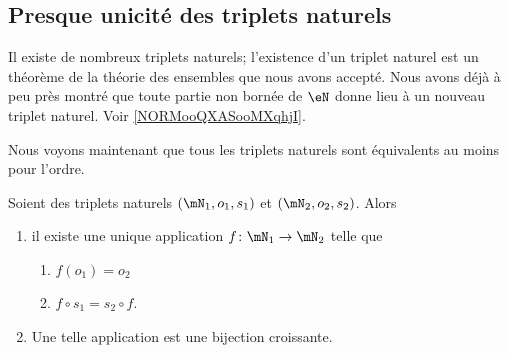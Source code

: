 \subsection{Presque unicité des triplets naturels}
\label{SUBooUniciteTripletsNaturels}

\begin{normaltext}	\label{NORooIntroUniciteTripletsNaturels}
	Il existe de nombreux triplets naturels; l'existence d'un triplet naturel est un théorème de la théorie des ensembles que nous avons accepté. Nous avons déjà à peu près montré que toute partie non bornée de \( \eN\) donne lieu à un nouveau triplet naturel. Voir \ref{NORMooQXASooMXqhjI}.

	Nous voyons maintenant que tous les triplets naturels sont équivalents au moins pour l'ordre.
\end{normaltext}

\begin{theorem}     \label{THOooFUXMooJuigHK}
	Soient des triplets naturels \( (\mN_1,o_1,s_1)\) et \( (\mN_2,o_2,s_2)\). Alors
	\begin{enumerate}
		\item
		      il existe une unique application \( f\colon \mN_1\to \mN_2\) telle que
		      \begin{enumerate}
			      \item
			            \( f(o_1)=o_2\)
			      \item
			            \( f\circ s_1=s_2\circ f\).
		      \end{enumerate}
		\item
		      Une telle application est une bijection croissante.
	\end{enumerate}
\end{theorem}

